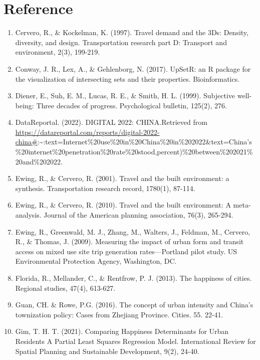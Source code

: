\documentclass[
]{article}
\providecommand{\tightlist}{%
  \setlength{\itemsep}{0pt}\setlength{\parskip}{0pt}}
\begin{document}
\hypertarget{reference}{%
\section{Reference}\label{reference}}

\begin{enumerate}
\def\labelenumi{\arabic{enumi})}
\tightlist
\item
  Cervero, R., \& Kockelman, K. (1997). Travel demand and the 3Ds:
  Density, diversity, and design. Transportation research part D:
  Transport and environment, 2(3), 199-219.
\item
  Conway, J. R., Lex, A., \& Gehlenborg, N. (2017). UpSetR: an R package
  for the visualization of intersecting sets and their properties.
  Bioinformatics.
\item
  Diener, E., Suh, E. M., Lucas, R. E., \& Smith, H. L. (1999).
  Subjective well-being: Three decades of progress. Psychological
  bulletin, 125(2), 276.
\item
  DataReportal. (2022). DIGITAL 2022: CHINA.Retrieved from
  \url{https://datareportal.com/reports/digital-2022-china\#}:\textasciitilde:text=Internet\%20use\%20in\%20China\%20in\%202022\&text=China's\%20internet\%20penetration\%20rate\%20stood,percent)\%20between\%202021\%20and\%202022.
\item
  Ewing, R., \& Cervero, R. (2001). Travel and the built environment: a
  synthesis. Transportation research record, 1780(1), 87-114.
\item
  Ewing, R., \& Cervero, R. (2010). Travel and the built environment: A
  meta-analysis. Journal of the American planning association, 76(3),
  265-294.
\item
  Ewing, R., Greenwald, M. J., Zhang, M., Walters, J., Feldman, M.,
  Cervero, R., \& Thomas, J. (2009). Measuring the impact of urban form
  and transit access on mixed use site trip generation rates---Portland
  pilot study. US Environmental Protection Agency, Washington, DC.
\item
  Florida, R., Mellander, C., \& Rentfrow, P. J. (2013). The happiness
  of cities. Regional studies, 47(4), 613-627.
\item
  Guan, CH. \& Rowe, P.G. (2016). The concept of urban intensity and
  China's townization policy: Cases from Zhejiang Province. Cities. 55.
  22-41.
\item
  Gim, T. H. T. (2021). Comparing Happiness Determinants for Urban
  Residents A Partial Least Squares Regression Model. International
  Review for Spatial Planning and Sustainable Development, 9(2), 24-40.

\end{enumerate}
\end{document}
